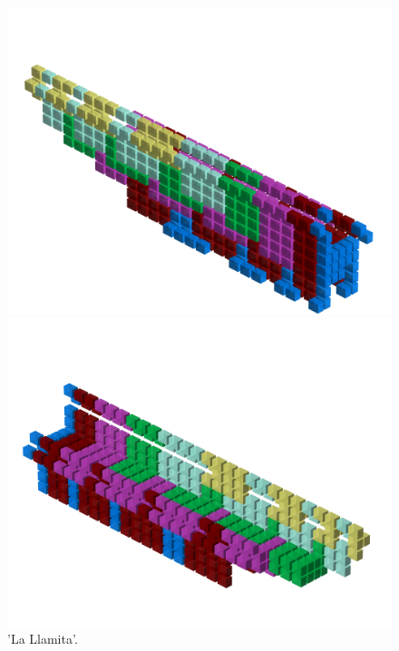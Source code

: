 \clearpage
\begin{figure}[H]
    \centering
    \begin{adjustbox}{width=12cm,center}
      \includegraphics[width=12cm]{src/patterns/pattern2-45.png}%
    \end{adjustbox}
    \begin{adjustbox}{width=12cm,margin=0cm -4cm}
      \includegraphics[width=12cm]{src/patterns/pattern2-225.png}%
    \end{adjustbox}
\caption{'La Llamita'.}
\end{figure}
\clearpage

